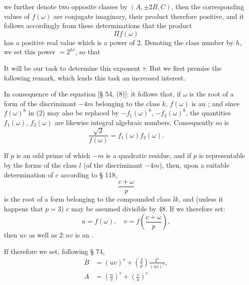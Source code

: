 we further denote two opposite classes by $(A, \pm 2B, C)$, then the
corresponding values of $f(\omega)$ are conjugate imaginary, their product
therefore positive, and it follows accordingly from these determinations
that the product
\[
\Pi f(\omega)
\]
has a positive real value which is a power of 2. Denoting the class number
by $h$, we set this power $= 2^{h\tau}$, so that

It will be our task to determine this exponent $\tau$. But we first premise
the following remark, which lends this task an increased interest.

In consequence of the equation [§ 54, (8)]:
it follows that, if $\omega$ is the root of a form of the discriminant
$-4m$ belonging to the class $k$, $f(\omega)$ is an ; and since $f(\omega)^8$ in (2) may also be replaced by
$-f_1(\omega)^8$, $-f_2(\omega)^8$, the quantities $f_1(\omega)$,
$f_2(\omega)$ are likewise integral algebraic numbers. Consequently so is
\[
\frac{\sqrt{2}}{f(\omega)} = f_1(\omega) f_2(\omega).
\]

If $p$ is an odd prime of which $-m$ is a quadratic residue, and if $p$ is
representable by the forms of the class $l$ (of the discriminant $-4m$),
then, upon a suitable determination of $c$ according to § 118,
\[
\frac{c+\omega}{p}
\]
is the root of a form belonging to the compounded class $lk$, and (unless
it happens that $p=3$) $c$ may be assumed divisible by 48. If we therefore
set:
\[
u = f(\omega), \quad v = f\left(\frac{c+\omega}{p}\right),
\]
then $uv$ as well as $2:uv$ is an .

If therefore we set, following § 74,
\[
\begin{aligned}
B &= (uv)^s + \left(\frac{2}{p}\right)\frac{2^s}{(uv)^s},\\
A &= \left(\frac{u}{v}\right)^r + \left(\frac{v}{u}\right)^r
\end{aligned}
\]
